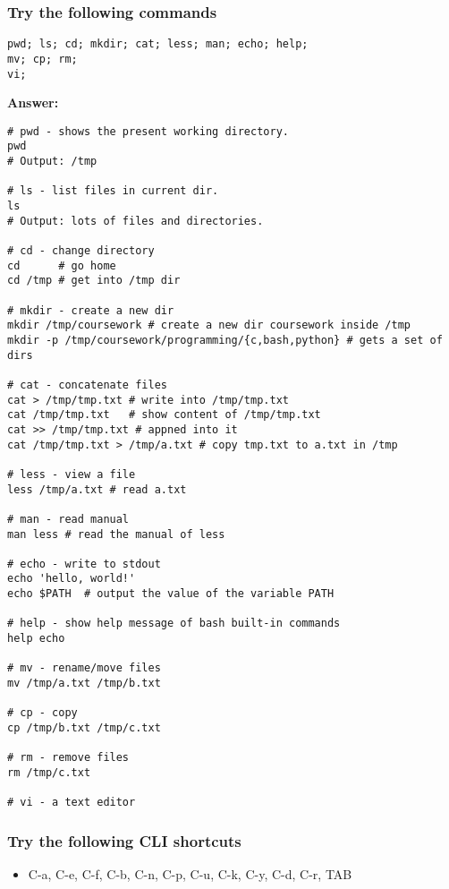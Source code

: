 \documentclass{swfucoursework}
\begin{document}
\subsubsection{Try the following
commands}\label{try-the-following-commands}

\begin{verbatim}
pwd; ls; cd; mkdir; cat; less; man; echo; help;
mv; cp; rm; 
vi;
\end{verbatim}

\textbf{Answer:}

\begin{verbatim}
# pwd - shows the present working directory.
pwd
# Output: /tmp

# ls - list files in current dir.
ls
# Output: lots of files and directories.

# cd - change directory
cd      # go home
cd /tmp # get into /tmp dir

# mkdir - create a new dir
mkdir /tmp/coursework # create a new dir coursework inside /tmp
mkdir -p /tmp/coursework/programming/{c,bash,python} # gets a set of dirs

# cat - concatenate files
cat > /tmp/tmp.txt # write into /tmp/tmp.txt
cat /tmp/tmp.txt   # show content of /tmp/tmp.txt
cat >> /tmp/tmp.txt # appned into it
cat /tmp/tmp.txt > /tmp/a.txt # copy tmp.txt to a.txt in /tmp

# less - view a file
less /tmp/a.txt # read a.txt

# man - read manual
man less # read the manual of less

# echo - write to stdout
echo 'hello, world!'
echo $PATH  # output the value of the variable PATH

# help - show help message of bash built-in commands
help echo

# mv - rename/move files
mv /tmp/a.txt /tmp/b.txt

# cp - copy
cp /tmp/b.txt /tmp/c.txt

# rm - remove files
rm /tmp/c.txt
 
# vi - a text editor
\end{verbatim}

\subsubsection{Try the following CLI
shortcuts}\label{try-the-following-cli-shortcuts}

\begin{itemize}
\tightlist
\item
  C-a, C-e, C-f, C-b, C-n, C-p, C-u, C-k, C-y, C-d, C-r, TAB
\end{itemize}
\end{document}
